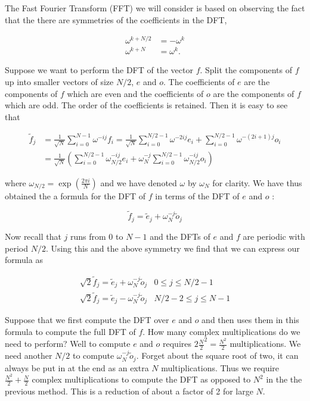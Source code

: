 \documentclass[10pt]{article}
\begin{document}
The Fast Fourier Transform (FFT) we will consider is based on observing the fact that the there are symmetries of the coefficients in the DFT,


\begin{align*}
\omega^{k+N / 2} & =-\omega^{k} \\
\omega^{k+N} & =\omega^{k} . \tag{8}
\end{align*}


Suppose we want to perform the DFT of the vector $f$. Split the components of $f$ up into smaller vectors of size $N / 2$, $e$ and $o$. The coefficients of $e$ are the components of $f$ which are even and the coefficients of $o$ are the components of $f$ which are odd. The order of the coefficients is retained. Then it is easy to see that


\begin{align*}
\tilde{f}_{j} & =\frac{1}{\sqrt{N}} \sum_{i=0}^{N-1} \omega^{-i j} f_{i}=\frac{1}{\sqrt{N}} \sum_{i=0}^{N / 2-1} \omega^{-2 i j} e_{i}+\sum_{i=0}^{N / 2-1} \omega^{-(2 i+1) j} o_{i} \\
& =\frac{1}{\sqrt{N}}\left(\sum_{i=0}^{N / 2-1} \omega_{N / 2}^{-i j} e_{i}+\omega_{N}^{-j} \sum_{i=0}^{N / 2-1} \omega_{N / 2}^{-i j} o_{i}\right) \tag{9}
\end{align*}


where $\omega_{N / 2}=\exp \left(\frac{2 \pi i}{N}\right)$ and we have denoted $\omega$ by $\omega_{N}$ for clarity. We have thus obtained the a formula for the DFT of $f$ in terms of the DFT of $e$ and $o$ :


\begin{equation*}
\tilde{f}_{j}=\tilde{e}_{j}+\omega_{N}^{-j} \tilde{o}_{j} \tag{10}
\end{equation*}


Now recall that $j$ runs from 0 to $N-1$ and the DFTs of $e$ and $f$ are periodic with period $N / 2$. Using this and the above symmetry we find that we can express our formula as

\[
\begin{array}{ll}
\sqrt{2} \tilde{f}_{j}=\tilde{e}_{j}+\omega_{N}^{-j} \tilde{o}_{j} & 0 \leq j \leq N / 2-1 \\
\sqrt{2} \tilde{f}_{j}=\tilde{e}_{j}-\omega_{N}^{-j} \tilde{o}_{j} & N / 2-2 \leq j \leq N-1 \tag{11}
\end{array}
\]

Suppose that we first compute the DFT over $e$ and $o$ and then uses them in this formula to compute the full DFT of $f$. How many complex multiplications do we need to perform? Well to compute $e$ and $o$ requires $2 \frac{N}{2}^{2}=\frac{N^{2}}{2}$ multiplications. We need another $N / 2$ to compute $\omega_{N}^{-j} \tilde{o}_{j}$. Forget about the square root of two, it can always be put in at the end as an extra $N$ multiplications. Thus we require $\frac{N^{2}}{2}+\frac{N}{2}$ complex multiplications to compute the DFT as opposed to $N^{2}$ in the the previous method. This is a reduction of about a factor of 2 for large $N$.
\end{document}
